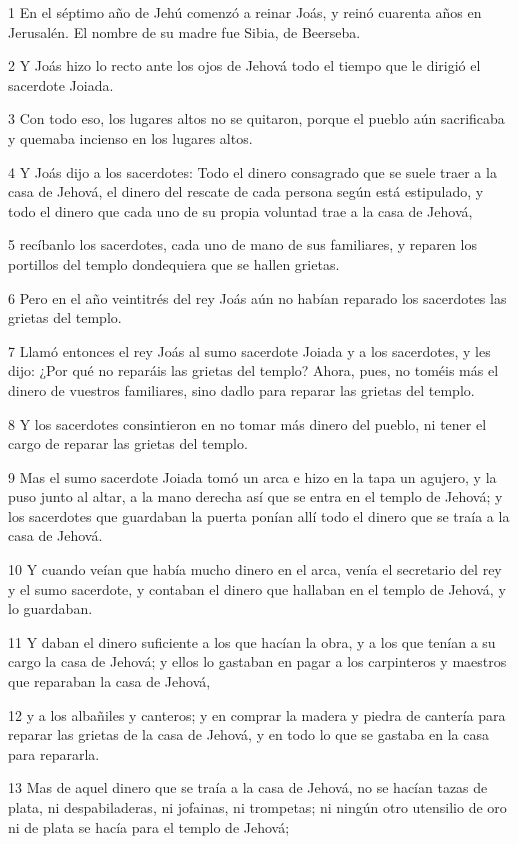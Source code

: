 \par 1 En el séptimo año de Jehú comenzó a reinar Joás, y reinó cuarenta años en Jerusalén. El nombre de su madre fue Sibia, de Beerseba.
\par 2 Y Joás hizo lo recto ante los ojos de Jehová todo el tiempo que le dirigió el sacerdote Joiada.
\par 3 Con todo eso, los lugares altos no se quitaron, porque el pueblo aún sacrificaba y quemaba incienso en los lugares altos.
\par 4 Y Joás dijo a los sacerdotes: Todo el dinero consagrado que se suele traer a la casa de Jehová, el dinero del rescate de cada persona según está estipulado, y todo el dinero que cada uno de su propia voluntad trae a la casa de Jehová,
\par 5 recíbanlo los sacerdotes, cada uno de mano de sus familiares, y reparen los portillos del templo dondequiera que se hallen grietas.
\par 6 Pero en el año veintitrés del rey Joás aún no habían reparado los sacerdotes las grietas del templo.
\par 7 Llamó entonces el rey Joás al sumo sacerdote Joiada y a los sacerdotes, y les dijo: ¿Por qué no reparáis las grietas del templo? Ahora, pues, no toméis más el dinero de vuestros familiares, sino dadlo para reparar las grietas del templo.
\par 8 Y los sacerdotes consintieron en no tomar más dinero del pueblo, ni tener el cargo de reparar las grietas del templo.
\par 9 Mas el sumo sacerdote Joiada tomó un arca e hizo en la tapa un agujero, y la puso junto al altar, a la mano derecha así que se entra en el templo de Jehová; y los sacerdotes que guardaban la puerta ponían allí todo el dinero que se traía a la casa de Jehová.
\par 10 Y cuando veían que había mucho dinero en el arca, venía el secretario del rey y el sumo sacerdote, y contaban el dinero que hallaban en el templo de Jehová, y lo guardaban.
\par 11 Y daban el dinero suficiente a los que hacían la obra, y a los que tenían a su cargo la casa de Jehová; y ellos lo gastaban en pagar a los carpinteros y maestros que reparaban la casa de Jehová,
\par 12 y a los albañiles y canteros; y en comprar la madera y piedra de cantería para reparar las grietas de la casa de Jehová, y en todo lo que se gastaba en la casa para repararla.
\par 13 Mas de aquel dinero que se traía a la casa de Jehová, no se hacían tazas de plata, ni despabiladeras, ni jofainas, ni trompetas; ni ningún otro utensilio de oro ni de plata se hacía para el templo de Jehová;
